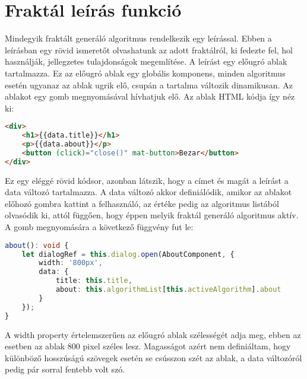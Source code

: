 \section*{Fraktál leírás funkció}
Mindegyik fraktált generáló algoritmus rendelkezik egy leírással. Ebben a leírásban egy rövid ismeretőt olvashatunk az adott fraktálról, ki fedezte fel, hol használják, jellegzetes tulajdonságok megemlítése. A leírást egy előugró ablak tartalmazza. Ez az előugró ablak egy globális komponens, minden algoritmus esetén ugyanaz az ablak ugrik elő, csupán a tartalma változik dinamikusan. Az ablakot egy gomb megnyomásával hívhatjuk elő. Az ablak HTML kódja így néz ki:
\begin{lstlisting}[language=html]
<div>
	<h1>{{data.title}}</h1>
	<p>{{data.about}}</p>
	<button (click)="close()" mat-button>Bezar</button>
</div>
\end{lstlisting}
Ez egy eléggé rövid kódsor, azonban látszik, hogy a címet és magát a leírást a data változó tartalmazza. A data változó akkor definiálódik, amikor az ablakot előhozó gombra kattint a felhasználó, az értéke pedig az algoritmus listából olvasódik ki, attól függően, hogy éppen melyik fraktál generáló algoritmus aktív. A gomb megnyomására a következő függvény fut le:
\begin{lstlisting}[language=typescript]
about(): void {
	let dialogRef = this.dialog.open(AboutComponent, {
		width: '800px',
		data: {
			title: this.title,
			about: this.algorithmList[this.activeAlgorithm].about
		}
	});
}
\end{lstlisting}
A width property értelemszerűen az előugró ablak szélességét adja meg, ebben az esetben az ablak 800 pixel széles lesz. Magasságot azért nem definiáltam, hogy különböző hosszúságú szövegek esetén se csússzon szét az ablak, a data változóról pedig pár sorral fentebb volt szó.